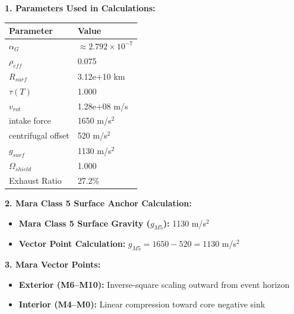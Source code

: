 \documentclass[11pt, a4paper]{article}
\begin{document}
\vspace{0.5em}
\noindent \textbf{1. Parameters Used in Calculations:}
\begin{center}
  \begin{tabular}{|l|l|}
    \hline
    \textbf{Parameter} & \textbf{Value} \\ \hline
    $\alpha_G$ & $\approx 2.792 \times 10^{-7}$ \\ \hline
    $\rho_{eff}$ & 0.075 \\ \hline
    $R_{surf}$ & 3.12e+10 km \\ \hline
    $\tau(T)$ & 1.000 \\ \hline
    $v_{rot}$ & 1.28e+08 m/s \\ \hline
    intake force & 1650 m/s$^2$ \\ \hline
    centrifugal offset & 520 m/s$^2$ \\ \hline
    $g_{surf}$ & 1130 m/s$^2$ \\ \hline
    $\Omega_{shield}$ & 1.000 \\ \hline
    Exhaust Ratio & 27.2\% \\ \hline
  \end{tabular}
\end{center}

\vspace{0.5em}
\noindent \textbf{2. Mara Class 5 Surface Anchor Calculation:}
\begin{itemize}
  \item \textbf{Mara Class 5 Surface Gravity ($g_{M5}$):} 1130 m/s$^2$
  \item \textbf{Vector Point Calculation:} $g_{M5} = 1650 - 520 = 1130$ m/s$^2$
\end{itemize}

\vspace{0.5em}
\noindent \textbf{3. Mara Vector Points:}
\begin{itemize}
  \item \textbf{Exterior (M6--M10):} Inverse-square scaling outward from event horizon
  \item \textbf{Interior (M4--M0):} Linear compression toward core negative sink
\end{itemize}
\end{document}
